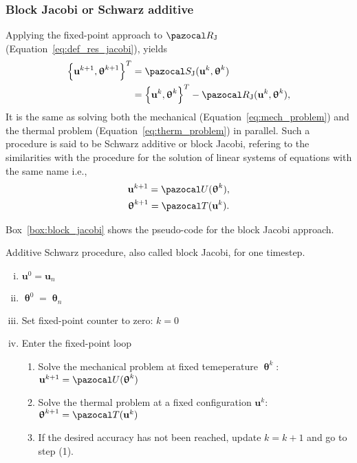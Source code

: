 \subsubsection{Block Jacobi or Schwarz additive}

Applying the fixed-point approach to \(\pazocal R_\mathrm{J}\) (Equation~\eqref{eq:def_res_jacobi}), yields
\begin{align}
  \left\{\mathbf u^{k+1}, \bm\uptheta^{k+1}\right\}^T &= \pazocal S_\mathrm{J}(\mathbf u^k, \bm\uptheta^k)\\
   &= \left\{\mathbf u^k, \bm\uptheta^k\right\}^T - \pazocal R_\mathrm{J}(\mathbf u^k, \bm \uptheta^k),
\end{align}
It is the same as solving both the mechanical (Equation~\eqref{eq:mech_problem}) and the thermal problem (Equation~\eqref{eq:therm_problem}) in parallel.
Such a procedure is said to be Schwarz additive or block Jacobi, refering to the similarities with the procedure for the solution of linear systems of equations with the same name i.e.,
\begin{gather}
\mathbf u^{k+1} = \pazocal U(\bm \uptheta^k),\\
\bm \uptheta^{k+1} = \pazocal T(\mathbf u^k).
\end{gather}

Box~\ref{box:block_jacobi} shows the pseudo-code for the block Jacobi approach.

\begin{framedbox}[htb]
  \caption{Additive Schwarz procedure, also called block Jacobi, for one timestep.}
  \label{box:block_jacobi}
  \begin{center}
    \begin{minipage}{0.9\textwidth}
    \begin{enumerate}[(i)]
    \item \(\mathbf u^0 = \mathbf u_{n}\)
    \item \(\bm \uptheta^0 = \bm \uptheta_n\)
    \item Set fixed-point counter to zero: \(k=0\)
    \item Enter the fixed-point loop
    \begin{enumerate}[(1)]
      \item Solve the mechanical problem at fixed temeperature \(\bm \uptheta^k\): \(\mathbf u^{k+1} = \pazocal U(\bm \uptheta^k)\)
      \item Solve the thermal problem at a fixed configuration \(\mathbf u^k\): \(\bm \uptheta^{k+1} = \pazocal T(\mathbf u^k)\)
      \item If the desired accuracy has not been reached, update \(k=k+1\) and go to step (1).

    \end{enumerate}
    \end{enumerate}
    \end{minipage}
  \end{center}
\end{framedbox}

